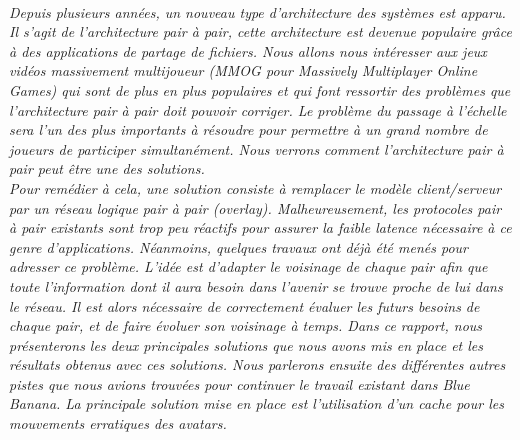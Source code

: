 \\
	\par \textit{Depuis plusieurs années, un nouveau type d'architecture des systèmes est apparu. Il s'agit de l'architecture pair à pair, cette architecture est devenue populaire grâce à des applications de partage de fichiers. Nous allons nous intéresser aux jeux vidéos massivement multijoueur (MMOG pour Massively Multiplayer Online Games) qui sont de plus en plus populaires et qui font ressortir des problèmes que l'architecture pair à pair doit pouvoir corriger. Le problème du passage à l'échelle sera l'un des plus importants à résoudre pour permettre à un grand nombre de joueurs de participer simultanément. Nous verrons comment l'architecture pair à pair peut être une des solutions.\\ 
	 Pour remédier à cela, une solution consiste à remplacer le modèle client/serveur par un réseau logique pair à pair (overlay). Malheureusement, les protocoles pair à pair existants sont trop peu réactifs pour assurer la faible latence nécessaire à ce genre d’applications. Néanmoins, quelques travaux ont déjà été menés pour adresser ce problème. L’idée est d’adapter le voisinage de chaque pair afin que toute l’information dont il aura besoin dans l'avenir se trouve proche de lui dans le réseau. Il est alors nécessaire de correctement évaluer les futurs besoins de chaque pair, et de faire évoluer son voisinage à temps. Dans ce rapport, nous présenterons les deux principales solutions que nous avons mis en place et les résultats obtenus avec ces solutions. Nous parlerons ensuite des différentes autres pistes que nous avions trouvées pour continuer le travail existant dans Blue Banana. La principale solution mise en place est l'utilisation d'un cache pour les mouvements erratiques des avatars.}\\
